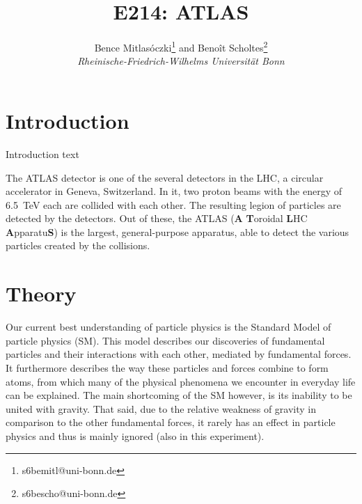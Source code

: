 \documentclass[twocolumn]{article}
\title{\textbf{E214: ATLAS}}
\author{Bence Mitlasóczki\thanks{s6bemitl@uni-bonn.de} and Beno\^it Scholtes\thanks{s6bescho@uni-bonn.de} \\ \textit{Rheinische-Friedrich-Wilhelms Universit\"at Bonn}}
\begin{document}
\renewcommand{\abstractname}{\vspace{-\baselineskip}} %
\maketitle
\saythanks %
\section{Introduction}
Introduction text

The ATLAS detector is one of the several detectors in the LHC, a circular accelerator in Geneva, Switzerland. In it, two proton beams with the energy of 6.5~TeV each are collided with each other. The resulting legion %
of particles are detected by the detectors. Out of these, the ATLAS (\textbf{A} \textbf{T}oroidal \textbf{L}HC \textbf{A}pparatu\textbf{S}) is the largest, general-purpose apparatus, able to detect the various particles created by the collisions. 

\section{Theory}
Our current best understanding of particle physics is the Standard Model of particle physics (SM). This model describes our discoveries of fundamental particles and their interactions with each other, mediated by fundamental forces. It furthermore describes the way these particles and forces combine to form atoms, from which many of the physical phenomena we encounter in everyday life can be explained. The main shortcoming of the SM however, is its inability to be united with gravity. That said, due to the relative weakness of gravity in comparison to the other fundamental forces, it rarely has an effect in particle physics and thus is mainly ignored (also in this experiment).
\end{document}
